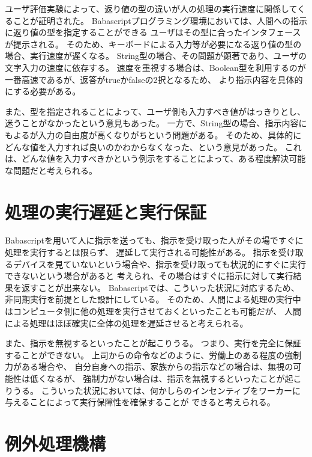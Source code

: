 ユーザ評価実験によって、返り値の型の違いが人の処理の実行速度に関係してくることが証明された。
Babascriptプログラミング環境においては、人間への指示に返り値の型を指定することができる
ユーザはその型に合ったインタフェースが提示される。
そのため、キーボードによる入力等が必要になる返り値の型の場合、実行速度が遅くなる。
String型の場合、その問題が顕著であり、ユーザの文字入力の速度に依存する。
速度を重視する場合は、Boolean型を利用するのが一番高速であるが、返答がtrueかfalseの2択となるため、
より指示内容を具体的にする必要がある。

また、型を指定されることによって、ユーザ側も入力すべき値がはっきりとし、迷うことがなかったという意見もあった。
一方で、String型の場合、指示内容にもよるが入力の自由度が高くなりがちという問題がある。
そのため、具体的にどんな値を入力すれば良いのかわからなくなった、という意見があった。
これは、どんな値を入力すべきかという例示をすることによって、ある程度解決可能な問題だと考えられる。

\section{処理の実行遅延と実行保証}\label{ux51e6ux7406ux306eux5b9fux884cux9045ux5ef6ux3068ux5b9fux884cux4fddux8a3c}

Babascriptを用いて人に指示を送っても、指示を受け取った人がその場ですぐに処理を実行するとは限らず、
遅延して実行される可能性がある。
指示を受け取るデバイスを見ていないという場合や、指示を受け取っても状況的にすぐに実行できないという場合があると
考えられ、その場合はすぐに指示に対して実行結果を返すことが出来ない。
Babascriptでは、こういった状況に対応するため、非同期実行を前提とした設計にしている。
そのため、人間による処理の実行中はコンピュータ側に他の処理を実行させておくといったことも可能だが、
人間による処理はほぼ確実に全体の処理を遅延させると考えられる。

また、指示を無視するといったことが起こりうる。
つまり、実行を完全に保証することができない。
上司からの命令などのように、労働上のある程度の強制力がある場合や、
自分自身への指示、家族からの指示などの場合は、無視の可能性は低くなるが、
強制力がない場合は、指示を無視するといったことが起こりうる。
こういった状況においては、何かしらのインセンティブをワーカーに与えることによって実行保障性を確保することが
できると考えられる。

\section{例外処理機構}\label{ux4f8bux5916ux51e6ux7406ux6a5fux69cb}

